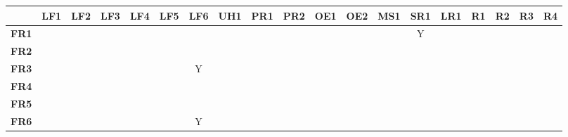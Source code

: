 \documentclass{article}
\begin{document}
\begin{table}[H]
\begin{adjustwidth}{-1.87in}{-1in}
\begin{tabular}{c|c|c|c|c|c|c|c|c|c|c|c|c|c|c|c|c|c|c|}
\cline{2-19}
                                    & \textbf{LF1} & \textbf{LF2} & \textbf{LF3} & \textbf{LF4} & \textbf{LF5} & \textbf{LF6} & \textbf{UH1} & \textbf{PR1} & \textbf{PR2} & \textbf{OE1} & \textbf{OE2} & \textbf{MS1} & \textbf{SR1} & \textbf{LR1} & \textbf{R1} & \textbf{R2} & \textbf{R3} & \textbf{R4} \\ \hline
\multicolumn{1}{|c|}{\textbf{FR1}}  &              &              &              &              &              &              &              &              &              &              &              &              & Y            &              &             &             &             &             \\ \hline
\multicolumn{1}{|c|}{\textbf{FR2}}  &              &              &              &              &              &              &              &              &              &              &              &              &              &              &             &             &             &             \\ \hline
\multicolumn{1}{|c|}{\textbf{FR3}}  &              &              &              &              &              & Y            &              &              &              &              &              &              &              &              &             &             &             &             \\ \hline
\multicolumn{1}{|c|}{\textbf{FR4}}  &              &              &              &              &              &              &              &              &              &              &              &              &              &              &             &             &             &             \\ \hline
\multicolumn{1}{|c|}{\textbf{FR5}}  &              &              &              &              &              &              &              &              &              &              &              &              &              &              &             &             &             &             \\ \hline
\multicolumn{1}{|c|}{\textbf{FR6}}  &              &              &              &              &              & Y            &              &              &              &              &              &              &              &              &             &             &             &             \\ \hline

\end{tabular}
\end{adjustwidth}
\end{table}
\end{document}
